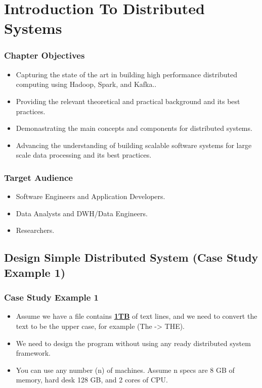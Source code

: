 \section{Introduction To Distributed Systems}


\begin{frame}
\frametitle{Chapter Objectives}

\begin{itemize} [<+->]
	\item Capturing the state of the art in building high performance distributed computing using Hadoop, Spark, and Kafka.. 
	\item Providing the relevant theoretical and practical background and its best practices.
	\item Demonastrating the main concepts and components for distributed systems. 
	\item Advancing the understanding of building scalable software systems for large scale data processing and its best practices. 
\end{itemize}

\end{frame}


\begin{frame}
	\frametitle{Target Audience}
	
	\begin{itemize} [<+->]
		\item Software Engineers and Application Developers.
		\item Data Analysts and DWH/Data Engineers.
		\item Researchers.
	\end{itemize}
	
\end{frame}

\subsection{Design Simple Distributed System (Case Study Example 1)}
\begin{frame}
	\frametitle{Case Study Example 1}
	\begin{itemize} 
		\item Assume we have a file contains \textbf{\underline{1TB}} of text lines, and we need to convert the text to be the upper case, for example (The -> THE).
		\item We need to design the program without using any ready distributed system framework.
		\item You can use any number (n) of machines. Assume n specs are 8 GB of memory, hard desk 128 GB, and 2 cores of CPU.

	\end{itemize}
\end{frame}

